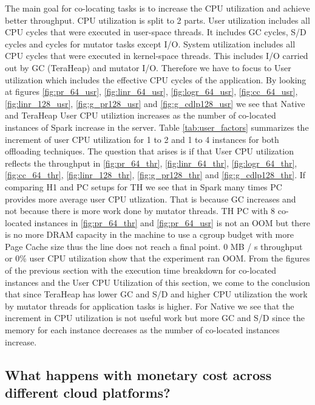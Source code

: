 The main goal for co-locating tasks is to increase the CPU utilization and achieve better
throughput. CPU utilization is split to 2 parts. 
User utilization includes all CPU cycles that were executed in user-space threads.
It includes GC cycles, S/D cycles and cycles for mutator tasks except I/O.
System utilization includes all CPU cycles that were executed in kernel-space threads.
This includes I/O carried out by GC (TeraHeap) and mutator I/O.
Therefore we have to focus to User utilization which includes the effective CPU cycles of the application.
By looking at figures \ref{fig:pr_64_usr}, \ref{fig:linr_64_usr},
\ref{fig:logr_64_usr}, \ref{fig:cc_64_usr}, \ref{fig:linr_128_usr}, \ref{fig:g_pr128_usr} and \ref{fig:g_cdlp128_usr} we see that Native and TeraHeap User CPU utiliztion
increases as the number of co-located instances of Spark increase in the server.
Table \ref{tab:user_factors} summarizes the increment of user CPU utilization for 1 to 2 and 1 to 4 instances for both offloading techniques.
The question that arises is if that User CPU utilization reflects the throughput in \ref{fig:pr_64_thr}, \ref{fig:linr_64_thr},
\ref{fig:logr_64_thr}, \ref{fig:cc_64_thr}, \ref{fig:linr_128_thr}, \ref{fig:g_pr128_thr} and \ref{fig:g_cdlp128_thr}. If comparing H1 and PC setups for TH we see that in Spark many times PC provides more average user CPU utlization. That is because GC increases and not because there is more work done by mutator threads. TH PC with 8 co-located instances in \ref{fig:pr_64_thr} and \ref{fig:pr_64_usr} is not an OOM but there is no more DRAM capacity in the machine to use a cgroup budget with more Page Cache size thus the line does not reach a final point. 0 MB / s throughput or 0\% user CPU utilization show that the experiment ran OOM.
From the figures of the previous section with the execution time breakdown for co-located instances and the User CPU Utilization of this section, we come to the conclusion that since TeraHeap has lower GC and S/D and higher CPU utilization the work by mutator threads for application tasks is higher.
For Native we see that the increment in CPU utilization is not useful work but more GC and S/D since the memory for each instance decreases as the number of co-located instances increase.

\subsection{What
happens with monetary cost across different cloud platforms?}

